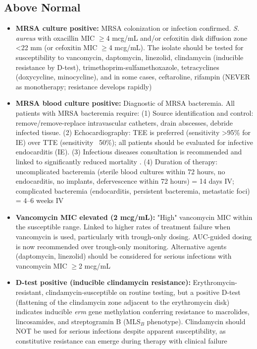 \subsection*{Above Normal}
\begin{itemize}
  \item \textbf{MRSA culture positive:} MRSA colonization or infection confirmed. \textit{S. aureus} with oxacillin MIC $\geq$4 mcg/mL and/or cefoxitin disk diffusion zone <22 mm (or cefoxitin MIC $\geq$4 mcg/mL). The isolate should be tested for susceptibility to vancomycin, daptomycin, linezolid, clindamycin (inducible resistance by D-test), trimethoprim-sulfamethoxazole, tetracyclines (doxycycline, minocycline), and in some cases, ceftaroline, rifampin (NEVER as monotherapy; resistance develops rapidly)
  \item \textbf{MRSA blood culture positive:} Diagnostic of MRSA bacteremia. All patients with MRSA bacteremia require: (1) Source identification and control: remove/remove-replace intravascular catheters, drain abscesses, debride infected tissue. (2) Echocardiography: TEE is preferred (sensitivity >95\% for IE) over TTE (sensitivity ~50\%); all patients should be evaluated for infective endocarditis (IE). (3) Infectious diseases consultation is recommended and linked to significantly reduced mortality \cite{holland2014clinical}. (4) Duration of therapy: uncomplicated bacteremia (sterile blood cultures within 72 hours, no endocarditis, no implants, defervescence within 72 hours) = 14 days IV; complicated bacteremia (endocarditis, persistent bacteremia, metastatic foci) = 4--6 weeks IV
  \item \textbf{Vancomycin MIC elevated (2 mcg/mL):} "High" vancomycin MIC within the susceptible range. Linked to higher rates of treatment failure when vancomycin is used, particularly with trough-only dosing. AUC-guided dosing is now recommended over trough-only monitoring. Alternative agents (daptomycin, linezolid) should be considered for serious infections with vancomycin MIC $\geq$2 mcg/mL
  \item \textbf{D-test positive (inducible clindamycin resistance):} Erythromycin-resistant, clindamycin-susceptible on routine testing, but a positive D-test (flattening of the clindamycin zone adjacent to the erythromycin disk) indicates inducible \textit{erm} gene methylation conferring resistance to macrolides, lincosamides, and streptogramin B (MLS$_{B}$ phenotype). Clindamycin should NOT be used for serious infections despite apparent susceptibility, as constitutive resistance can emerge during therapy with clinical failure
\end{itemize}

